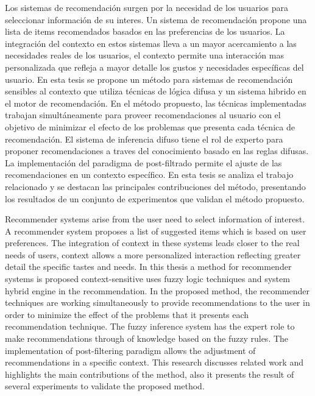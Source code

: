 
Los sistemas de recomendaci\'on surgen por la necesidad 
de los usuarios para seleccionar informaci\'on de su interes. 
Un sistema de recomendaci\'on propone una lista de items 
recomendados basados en las preferencias de los usuarios. 
La integraci\'on del contexto en estos sistemas lleva a 
un mayor acercamiento a las necesidades reales de los 
usuarios, el contexto permite una interacci\'on mas 
personalizada que refleja a mayor detalle los gustos y 
necesidades espec\'ificas del usuario. En esta tesis se 
propone un m\'etodo para sistemas de recomendaci\'on 
sensibles al contexto que utiliza t\'ecnicas de l\'ogica 
difusa y un sistema hibrido en el motor de recomendaci\'on. 
En el m\'etodo propuesto, las t\'ecnicas implementadas 
trabajan simult\'aneamente para proveer recomendaciones 
al usuario con el objetivo de minimizar el efecto de 
los problemas que presenta cada t\'ecnica de 
recomendaci\'on. El sistema de inferencia difuso 
tiene el rol de experto para proponer recomendaciones 
a traves del conocimiento basado en las reglas difusas. 
La implementaci\'on del paradigma de post-filtrado 
permite el ajuste de las recomendaciones en un 
contexto espec\'ifico. En esta tesis se analiza el 
trabajo relacionado y se destacan las principales 
contribuciones del m\'etodo, presentando los resultados 
de un conjunto de experimentos que validan el 
m\'etodo propuesto.


Recommender systems arise from the user need
to select information of interest. A recommender system
proposes a list of suggested items which is based on
user preferences. The integration of context in these
systems leads closer to the real needs of
users, context allows a more personalized interaction
reflecting greater detail the specific tastes and needs.
In this thesis a method for recommender systems is 
proposed context-sensitive uses fuzzy logic techniques 
and system hybrid engine in the recommendation. 
In the proposed method, the recommender techniques 
are working simultaneously to provide recommendations 
to the user in order to minimize the effect of the 
problems that it presents each recommendation technique. 
The fuzzy inference system has the expert role to 
make recommendations through of knowledge based on 
the fuzzy rules. The implementation of post-filtering 
paradigm allows the adjustment of recommendations in a 
specific context. This research discusses related work 
and highlights the main contributions of the method, 
also it presents the result of several experiments 
to validate the proposed method.












